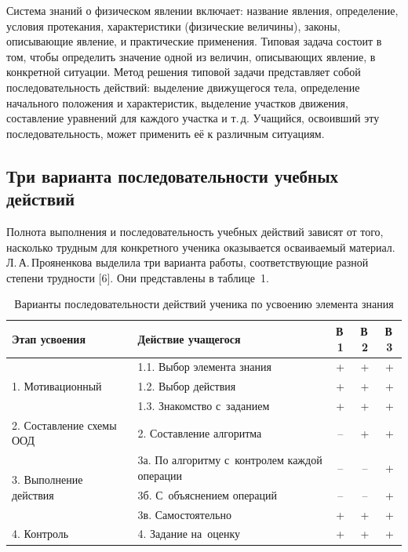 \documentclass[14pt]{extarticle}
\begin{document}
Система знаний о физическом явлении включает: название явления, определение,
условия протекания, характеристики (физические величины), законы,
описывающие явление, и практические применения.
Типовая задача состоит в том, чтобы определить значение одной из величин,
описывающих явление, в конкретной ситуации. Метод решения типовой задачи
представляет собой последовательность действий: выделение движущегося тела,
определение начального положения и характеристик, выделение участков движения,
составление уравнений для каждого участка и т.\,д. Учащийся, освоивший эту
последовательность, может применить её к различным ситуациям.


\subsection{Три варианта последовательности учебных действий}

Полнота выполнения и последовательность учебных действий зависят от того,
насколько трудным для конкретного ученика оказывается осваиваемый материал.
Л.\,А.\,Прояненкова выделила три варианта работы, соответствующие разной
степени трудности [6]. Они представлены в таблице~1.

\begin{table}[htbp]
\centering
\caption{Варианты последовательности действий ученика по усвоению элемента знания}
\label{tab:variants}
\small
\begin{tabular}{|p{3.5cm}|p{5.5cm}|c|c|c|}
\hline
\textbf{Этап усвоения} & \textbf{Действие учащегося} & \textbf{В\,1} & \textbf{В\,2} & \textbf{В\,3} \\
\hline
\multirow{3}{3.5cm}{1. Мотивационный}
  & 1.1. Выбор элемента знания    & + & + & + \\
  & 1.2. Выбор действия            & + & + & + \\
  & 1.3. Знакомство с~заданием     & + & + & + \\
\hline
2. Составление схемы ООД
  & 2. Составление алгоритма       & -- & + & + \\
\hline
\multirow{3}{3.5cm}{3. Выполнение действия}
  & 3а. По алгоритму с~контролем каждой операции & -- & -- & + \\
  & 3б. С~объяснением операций      & -- & -- & + \\
  & 3в. Самостоятельно              & + & + & + \\
\hline
4. Контроль
  & 4. Задание на~оценку            & + & + & + \\
\hline
\end{tabular}
\end{table}
\end{document}

